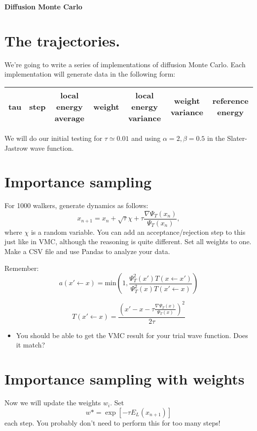 \documentclass[12pt]{article}
\begin{document}
	{\bf Diffusion Monte Carlo } 

\section*{The trajectories.} 

We're going to write a series of implementations of diffusion Monte Carlo.
Each implementation will generate data in the following form: 

\begin{tabular}{ccccccc}
tau&step&local energy average&weight&local energy variance &weight variance&reference energy\\
\hline
\end{tabular}


We will do our initial testing for $\tau\simeq 0.01$ and using $\alpha=2,\beta=0.5$ in the Slater-Jastrow wave function.
	
\section{Importance sampling} 

For 1000 walkers, generate dynamics as follows: 
\begin{equation}
x_{n+1} = x_n + \sqrt{\tau}\chi + \tau \frac{\nabla \Psi_T(x_n)}{\Psi_T(x_n)},
\end{equation}
where $\chi$ is a random variable. 
You can add an acceptance/rejection step to this just like in VMC, although the reasoning is quite different.
Set all weights to one.
Make a CSV file and use Pandas to analyze your data. 

Remember:
\begin{equation}
	a(x' \leftarrow x) = \text{min}\left(1,\frac{\Psi_T^2(x') T(x \leftarrow x')}{\Psi_T^2(x) T(x' \leftarrow x)} \right)
\end{equation}

\begin{equation}
	T(x'\leftarrow x) = \frac{ \left(x' - x - \tau \frac{\nabla \Psi_T(x)}{\Psi_T(x)}\right)^2}{ 2\tau}
\end{equation}

\begin{itemize}
\item You should be able to get the VMC result for your trial wave function. Does it match? 
\end{itemize}

\section{Importance sampling with weights}
Now we will update the weights $w_i$. Set 
\begin{equation}
w*=	\exp[-\tau E_L(x_{n+1})] 
\end{equation}
each step.
You probably don't need to perform this for too many steps!
\end{document}
